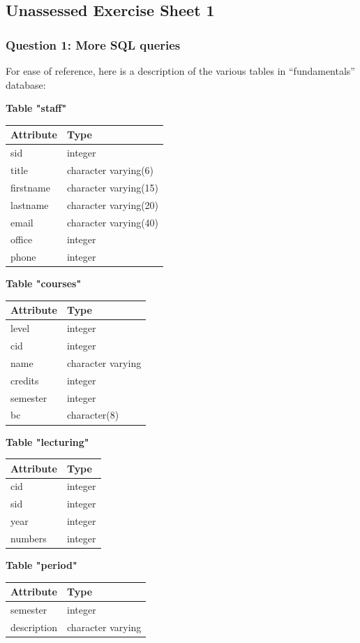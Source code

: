 
\subsection{Unassessed Exercise Sheet 1}
\subsubsection{Question 1: More SQL queries}

For ease of reference, here is a description of the various tables in ``fundamentals'' database:

\textbf{Table "staff"}
\begin{tabular}{ll}
\textbf{Attribute} & \textbf{Type} \\
\hline
sid & integer \\
title & character varying(6) \\
firstname & character varying(15) \\
lastname & character varying(20) \\
email & character varying(40) \\
office & integer \\
phone & integer \\
\end{tabular}

\textbf{Table "courses"}
\begin{tabular}{ll}
\textbf{Attribute} & \textbf{Type} \\
\hline
level & integer \\
cid & integer \\
name & character varying \\
credits & integer \\
semester & integer \\
bc & character(8) \\
\end{tabular}

\textbf{Table "lecturing"}
\begin{tabular}{ll}
\textbf{Attribute} & \textbf{Type} \\
\hline
cid & integer \\
sid & integer \\
year & integer \\
numbers & integer \\
\end{tabular}

\textbf{Table "period"}
\begin{tabular}{ll}
\textbf{Attribute} & \textbf{Type} \\
\hline
semester & integer \\
description & character varying \\
\end{tabular}

